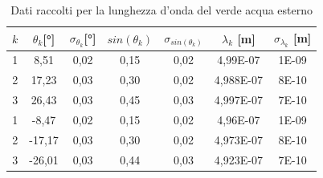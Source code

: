 \documentclass{article}
\begin{document}
        \begin{table}[H]
            
            \centering

            \begin{tabular}{c c c c c c c}

                \toprule 
                $k$ & $\theta_k$[°] & $\sigma_{\theta_k}$[°] & $sin(\theta_k)$ & $\sigma_{sin(\theta_k)}$ & $\lambda_k$ [m] & $\sigma_{\lambda_k}$ [m] \\
                
                \midrule
                1	&	8,51	&	0,02	&	0,15	&	0,02	&	4,99E-07	&	1E-09\\
                2	&	17,23	&	0,03	&	0,30	&	0,02	&	4,988E-07	&	8E-10\\
                3	&	26,43	&	0,03	&	0,45	&	0,03	&	4,997E-07	&	7E-10\\
                1	&	-8,47	&	0,02	&	0,15	&	0,02	&	4,96E-07	&	1E-09\\
                2	&	-17,17	&	0,03	&	0,30	&	0,02	&	4,973E-07	&	8E-10\\
                3	&	-26,01	&	0,03	&	0,44	&	0,03	&	4,923E-07	&	7E-10\\
                \bottomrule

            \end{tabular}

            \caption{Dati raccolti per la lunghezza d'onda del verde acqua esterno}
            
        \end{table}
        \label{table:verda acq est}
\end{document}
